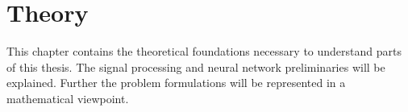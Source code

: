 \chapter{Theory}
This chapter contains the theoretical foundations necessary to understand parts of this thesis. 
The signal processing and neural network preliminaries will be explained.
Further the problem formulations will be represented in a mathematical viewpoint.











